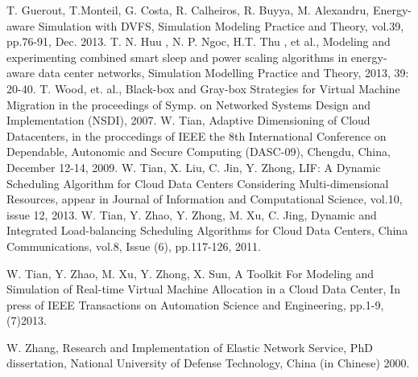 \documentclass[3p, twocolumn]{elsarticle}
\begin{document}
\begin{thebibliography}{99}
T. Guerout, T.Monteil, G. Costa, R. Calheiros, R. Buyya, M. Alexandru, Energy-aware Simulation with DVFS, Simulation Modeling Practice and Theory, vol.39, pp.76-91, Dec. 2013.
T. N. Huu , N. P. Ngoc, H.T. Thu , et al., Modeling and experimenting combined smart sleep and power scaling algorithms in energy-aware data center networks, Simulation Modelling Practice and Theory, 2013, 39: 20-40.
T. Wood, et. al., Black-box and Gray-box Strategies for Virtual Machine Migration in the proceedings of Symp. on Networked Systems Design and Implementation (NSDI), 2007.
W. Tian, Adaptive Dimensioning of Cloud Datacenters, in the proccedings of IEEE the 8th International Conference on Dependable, Autonomic and Secure Computing (DASC-09), Chengdu, China, December 12-14, 2009.
W. Tian, X. Liu, C. Jin, Y. Zhong, LIF: A Dynamic Scheduling Algorithm for Cloud Data Centers Considering Multi-dimensional Resources, appear in Journal of Information and Computational Science, vol.10, issue 12, 2013.
W. Tian, Y. Zhao, Y. Zhong, M. Xu, C. Jing, Dynamic and Integrated Load-balancing Scheduling Algorithms for Cloud Data Centers, China Communications, vol.8, Issue (6), pp.117-126, 2011.


W. Tian, Y. Zhao, M. Xu, Y. Zhong, X. Sun, A Toolkit For Modeling and Simulation of Real-time Virtual Machine Allocation in a Cloud Data Center, In press of IEEE Transactions on Automation Science and Engineering, pp.1-9, (7)2013.


W. Zhang, Research and Implementation of Elastic Network Service, PhD dissertation, National University of Defense Technology, China (in Chinese) 2000.

\end{thebibliography}
\end{document}
